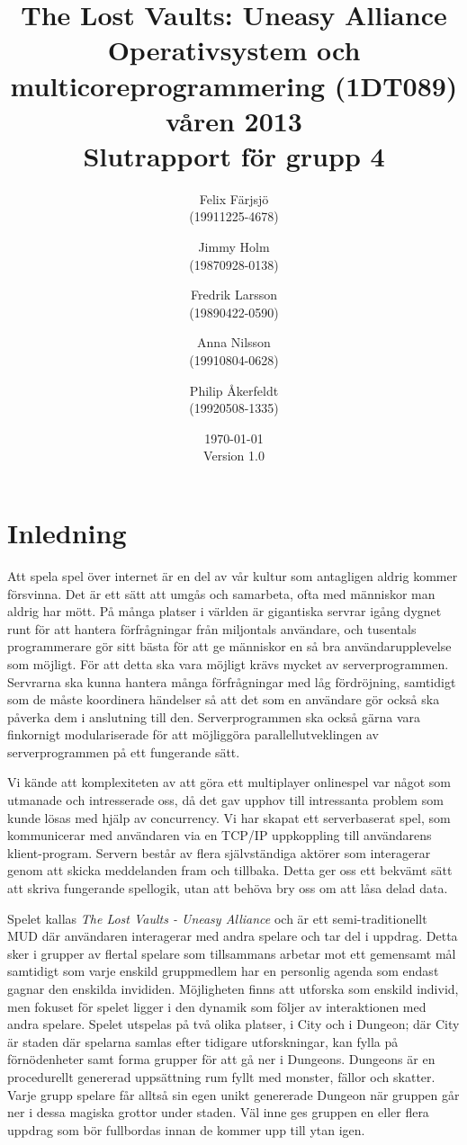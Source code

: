 \documentclass[a4paper]{article}
\title{The Lost Vaults: Uneasy Alliance\\\small{Operativsystem och multicoreprogrammering (1DT089) våren 2013}\\\small{Slutrapport för grupp 4}}
\author{Felix Färjsjö\\(19911225-4678) \and Jimmy Holm\\(19870928-0138) \and Fredrik Larsson\\(19890422-0590) \and Anna Nilsson\\(19910804-0628) \and Philip Åkerfeldt\\(19920508-1335)}
\date{\today\\Version 1.0}
\begin{document}
\maketitle
\newpage
\tableofcontents
\listoffigures
\newpage
\section{Inledning}
Att spela spel över internet är en del av vår kultur som antagligen aldrig kommer försvinna. Det är ett sätt att umgås och samarbeta, ofta med människor man aldrig har mött. 
På många platser i världen är gigantiska servrar igång dygnet runt för att hantera förfrågningar från miljontals användare, och tusentals programmerare gör sitt bästa för 
att ge människor en så bra användarupplevelse som möjligt. 
För att detta ska vara möjligt krävs mycket av serverprogrammen. 
Servrarna ska kunna hantera många förfrågningar med låg fördröjning, samtidigt som de måste koordinera händelser så att det som en användare gör också ska påverka dem i anslutning till den. 
Serverprogrammen ska också gärna vara finkornigt modulariserade för att möjliggöra parallellutveklingen av serverprogrammen på ett fungerande sätt.  
 
Vi kände att komplexiteten av att göra ett multiplayer onlinespel var något som utmanade och intresserade oss, då det gav upphov till intressanta problem som kunde lösas med hjälp av concurrency. 
Vi har skapat ett serverbaserat spel, som kommunicerar med användaren via en TCP/IP uppkoppling till användarens klient-program. Servern består av flera självständiga aktörer som interagerar
genom att skicka meddelanden fram och tillbaka. Detta ger oss ett bekvämt sätt att skriva fungerande spellogik, utan att behöva bry oss om att låsa delad data.

Spelet kallas \textit{The Lost Vaults - Uneasy Alliance} och är ett semi-traditionellt MUD där användaren interagerar med andra spelare och tar del i uppdrag. 
Detta sker i grupper av flertal spelare som tillsammans arbetar mot ett gemensamt mål samtidigt som varje enskild gruppmedlem har en personlig agenda som endast 
gagnar den enskilda invididen. Möjligheten finns att utforska som enskild individ, men fokuset för spelet ligger i den dynamik som följer av 
interaktionen med andra spelare. Spelet utspelas på två olika platser, i City och i Dungeon; där City är staden där spelarna samlas efter tidigare utforskningar, 
kan fylla på förnödenheter samt forma grupper för att gå ner i Dungeons. Dungeons är en procedurellt genererad uppsättning rum fyllt med monster, fällor och skatter. 
Varje grupp spelare får alltså sin egen unikt genererade Dungeon när gruppen går ner i dessa magiska grottor under staden. Väl inne ges 
gruppen en eller flera uppdrag som bör fullbordas innan de kommer upp till ytan igen.
\end{document}
